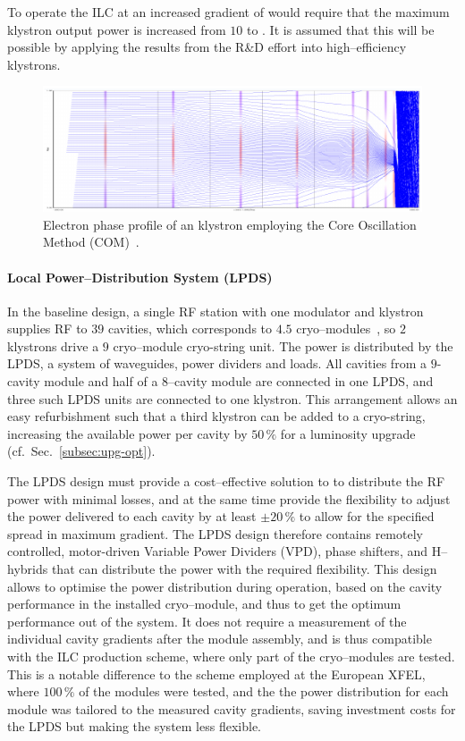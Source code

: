 To operate the ILC at an increased gradient of  would require that the maximum klystron output power is increased from $10$ to . 
It is assumed that this will be possible by applying the results from the R\&D effort into high--efficiency klystrons.
 
\begin{figure}[htbp]
   \includegraphics[width=\hsize]{chapters/figures/eefact16-wet3ah2-fig1}
\caption{Electron phase  profile of an  klystron employing the Core Oscillation Method (COM)~\cite{Constable:2017hha}.
}
\label{fig:com}
\end{figure}

\paragraph{Local Power--Distribution System (LPDS)}

In the baseline design, a single RF station with one modulator and klystron supplies RF to $39$ cavities, which corresponds to $4.5$ cryo--modules~\cite[Sec. 3.6.4]{Adolphsen:2013kya}, so $2$ klystrons drive a $9$ cryo--module cryo-string unit.
The power is distributed by the LPDS, a system of waveguides, power dividers and loads. 
All cavities from a $9$-cavity module and half of a $8$--cavity module are connected in one LPDS, and three such LPDS units are connected to one klystron.
This arrangement allows an easy refurbishment such that a third klystron can be added to a cryo-string, increasing the available power per cavity by $50\,\%$ for a luminosity upgrade (cf.\ Sec.~\ref{subsec:upg-opt}).

The LPDS design must provide a cost--effective solution to to distribute the RF power with minimal losses, and at the same time provide the flexibility to adjust the power delivered to each cavity by at least $\pm20\,\%$ to allow for the specified spread in maximum gradient. 
The LPDS design therefore contains remotely controlled, motor-driven Variable Power Dividers (VPD), phase shifters, and H--hybrids that can distribute the power with the required flexibility.
This design allows to optimise the power distribution during operation, based on the cavity performance in the installed cryo--module, and thus to get the optimum performance out of the system.
It does not require a measurement of the individual cavity gradients after the module assembly, and is thus compatible with the ILC production scheme, where only part of the cryo--modules are tested.
This is a notable difference to the scheme employed at the European XFEL, where $100\,\%$ of the modules were tested, and the the power distribution for each module was tailored to the measured cavity gradients, saving investment costs for the LPDS but making the system less flexible.

